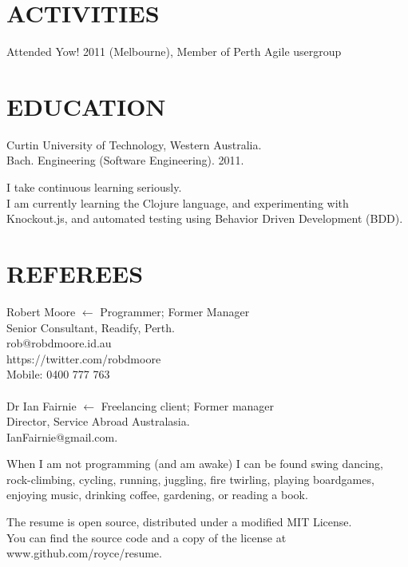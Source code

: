 \documentclass[margin]{res}
\begin{document}
\begin{resume}

  \section{ACTIVITIES}
  Attended Yow! 2011 (Melbourne),
  Member of Perth Agile usergroup

  \section{EDUCATION}
  Curtin University of Technology, Western Australia. \\
  Bach. Engineering (Software Engineering). 2011.
  
  I take continuous learning seriously.\\
  I am currently learning the Clojure language, and experimenting with Knockout.js, and automated testing using
  Behavior Driven Development (BDD).

  \section{REFEREES}
  Robert Moore
  \hfill $\longleftarrow$ Programmer; Former Manager\\
  Senior Consultant, Readify, Perth. \\
  rob@robdmoore.id.au \\
  https://twitter.com/robdmoore \\
  Mobile: 0400 777 763 \\
  \\
  Dr Ian Fairnie
  \hfill $\longleftarrow$ Freelancing client; Former manager\\
  Director, Service Abroad Australasia. \\
  IanFairnie@gmail.com. \\

\end{resume} 

\vfill
\centering

\hspace{-1.75in}  When I am not programming (and am awake) I can be found swing dancing, \\
\hspace{-1.75in}  rock-climbing, cycling, running, juggling, fire twirling, playing boardgames, \\
\hspace{-1.75in}  enjoying music, drinking coffee, gardening, or reading a book.

\vfill
\hspace{-1.75in}  The resume is open source, distributed under a modified MIT License. \\
\hspace{-1.75in}  You can find the source code and a copy of the license at www.github.com/royce/resume.
\end{document}
